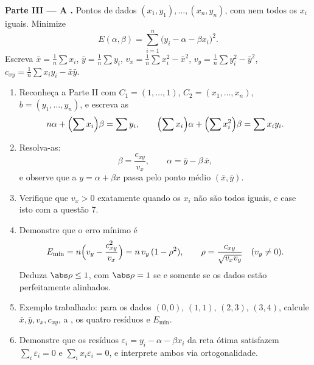 \begin{problem}
\medskip
\noindent\textbf{Parte III --- A .} Pontos de dados
$(x_1, y_1), \dots, (x_n, y_n)$, com nem todos os $x_i$ iguais. Minimize
\[
E(\alpha, \beta) = \sum_{i=1}^{n}\bigl(y_i - \alpha - \beta
x_i\bigr)^2 .
\]
Escreva $\bar x = \frac1n\sum x_i$, $\bar y = \frac1n\sum y_i$, $v_x = \frac1n\sum x_i^2 - \bar x^2$, $v_y = \frac1n\sum y_i^2 -
\bar y^2$, $c_{xy} = \frac1n\sum x_i y_i - \bar x\bar y$.
\begin{enumerate}[resume]
  \item Reconheça a Parte II com $C_1 = (1, \dots, 1)$, $C_2 =
        (x_1, \dots, x_n)$, $b = (y_1, \dots, y_n)$, e escreva as
        \[
        n\alpha + \Bigl(\sum x_i\Bigr)\beta = \sum y_i,
        \qquad
        \Bigl(\sum x_i\Bigr)\alpha + \Bigl(\sum
        x_i^2\Bigr)\beta = \sum x_i y_i .
        \]
  \item Resolva-as:
        \[
        \beta = \frac{c_{xy}}{v_x},
        \qquad
        \alpha = \bar y - \beta\,\bar x ,
        \]
        e observe que a \emph{} $y = \alpha
        + \beta x$ passa pelo
        ponto médio $(\bar x, \bar
        y)$.
  \item Verifique que $v_x > 0$ exatamente quando os $x_i$ não são
        todos iguais, e case isto com a questão 7.
  \item Demonstre que o erro mínimo é
        \[
        E_{\min} = n\Bigl(v_y - \frac{c_{xy}^2}{v_x}\Bigr)
        = n\,v_y\,(1 - \rho^2),
        \qquad
        \rho = \frac{c_{xy}}{\sqrt{v_x v_y}}
        \quad (v_y \neq 0).
        \]
        Deduza $\abs\rho \leq 1$, com $\abs\rho = 1$ se e somente se os dados estão
        perfeitamente alinhados.
  \item Exemplo trabalhado: para os dados $(0,0)$, $(1,1)$, $(2,3)$,
        $(3,4)$, calcule $\bar x, \bar y, v_x, c_{xy}$, a , os quatro
        resíduos e $E_{\min}$.
  \item Demonstre que os resíduos $\varepsilon_i = y_i - \alpha -
        \beta x_i$ da reta ótima satisfazem
        $\sum_i
        \varepsilon_i = 0$ e $\sum_i x_i\varepsilon_i = 0$, e interprete ambos via ortogonalidade.
\end{enumerate}


\end{problem}

